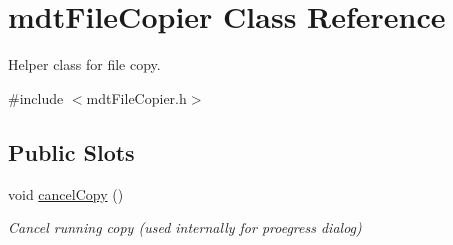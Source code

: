 \hypertarget{classmdt_file_copier}{
\section{mdtFileCopier Class Reference}
\label{classmdt_file_copier}
}


Helper class for file copy.  




{\ttfamily \#include $<$mdtFileCopier.h$>$}

\subsection*{Public Slots}
\begin{DoxyCompactItemize}
\item 
\hypertarget{classmdt_file_copier_ab9a0a4121a3fa0c70652413ad7917714}{
void \hyperlink{classmdt_file_copier_ab9a0a4121a3fa0c70652413ad7917714}{cancelCopy} ()}
\label{classmdt_file_copier_ab9a0a4121a3fa0c70652413ad7917714}

\begin{DoxyCompactList}\small\item\em Cancel running copy (used internally for proegress dialog) \end{DoxyCompactList}\end{DoxyCompactItemize}
